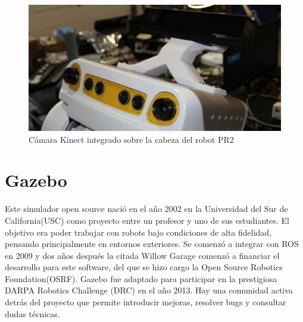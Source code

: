 \documentclass[12pt,spanish,chapterprefix, numbers=noenddot]{book}
\numberwithin{equation}{section}
\numberwithin{figure}{section}
\begin{document}
\begin{figure}[hbt!]
\centering
\includegraphics[width=12cm]{Figs/kinect.jpg}
\par
\caption{\label{fig:kinect}Cámara Kinect integrado sobre la cabeza del robot PR2}
\end{figure}


\section{Gazebo}
Este simulador open source nació en el año 2002 en la Universidad del Sur de California(USC) como proyecto entre un profesor y uno de sus estudiantes. El objetivo era poder trabajar con robots bajo condiciones de alta fidelidad, pensando principalmente en entornos exteriores. Se comenzó a integrar con ROS en 2009 y dos años después la citada Willow Garage comenzó a financiar el desarrollo para este software, del que se hizo cargo la Open Source Robotics Foundation(OSRF).
Gazebo fue adaptado para participar en la prestigiosa DARPA Robotics Challenge (DRC) en el año 2013. Hay una comunidad activa detrás del proyecto que permite introducir mejoras, resolver bugs y consultar dudas técnicas.
\end{document}
